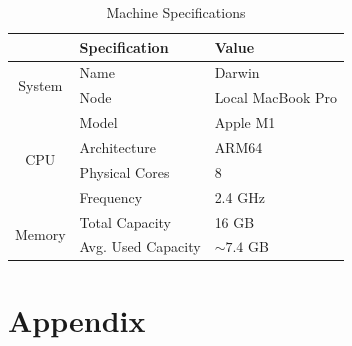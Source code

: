 \documentclass[a4paper]{article}
\begin{document}
  \begin{table}[ht]
    \centering
    \begin{tabular}{cll}
     \toprule
     & Specification & Value \\
     \midrule

     \multirow{2}{*}{System} & Name & Darwin \\
     \vspace{0.1cm}
     & Node & Local MacBook Pro \\

     \multirow{4}{*}{CPU} & Model & Apple M1 \\
     & Architecture & ARM64 \\
     & Physical Cores & 8 \\
     \vspace{0.1cm}
     & Frequency & 2.4 GHz \\

     \multirow{2}{*}{Memory} & Total Capacity & 16 GB \\
     & Avg. Used Capacity & $\sim 7.4$ GB \\

     \bottomrule
    \end{tabular}
    \caption{Machine Specifications}
    \label{tab:machine-specs}
  \end{table}
  


  \newpage
  
  

  \section{Appendix} %
  \label{sec:appendix}
\end{document}

